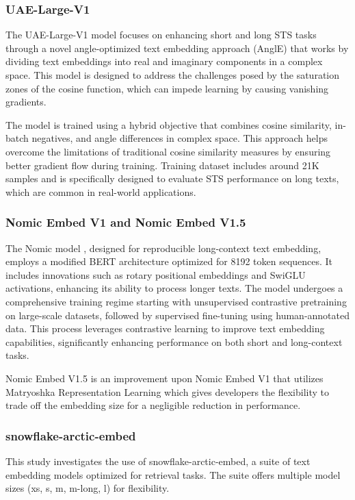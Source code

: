 \subsubsection{UAE-Large-V1} \label{model-uae-large-v1}
The UAE-Large-V1 model \cite{li2023angle} focuses on enhancing short and long \ac{STS} tasks through a novel angle-optimized text embedding approach (AnglE) that works by dividing text embeddings into real and imaginary components in a complex space.
This model is designed to address the challenges posed by the saturation zones of the cosine function, which can impede learning by causing vanishing gradients.

The model is trained using a hybrid objective that combines cosine similarity, in-batch negatives, and angle differences in complex space.
This approach helps overcome the limitations of traditional cosine similarity measures by ensuring better gradient flow during training.
Training dataset includes around 21K samples and is specifically designed to evaluate \ac{STS} performance on long texts, which are common in real-world applications.

\subsubsection{Nomic Embed V1 and Nomic Embed V1.5} \label{model:nomic-embed}
The Nomic model \cite{nussbaum2024nomic}, designed for reproducible long-context text embedding, employs a modified BERT architecture optimized for 8192 token sequences.
It includes innovations such as rotary positional embeddings and SwiGLU activations, enhancing its ability to process longer texts.
The model undergoes a comprehensive training regime starting with unsupervised contrastive pretraining on large-scale datasets, followed by supervised fine-tuning using human-annotated data.
This process leverages contrastive learning to improve text embedding capabilities, significantly enhancing performance on both short and long-context tasks.

Nomic Embed V1.5 is an improvement upon Nomic Embed V1 that utilizes Matryoshka Representation Learning \cite{kusupati2024matryoshka} which gives developers the flexibility to trade off the embedding size for a negligible reduction in performance.

\subsubsection{snowflake-arctic-embed} \label{model:snowflake-embed}
This study investigates the use of snowflake-arctic-embed, a suite of text embedding models optimized for retrieval tasks. The suite offers multiple model sizes (xs, s, m, m-long, l) for flexibility.

